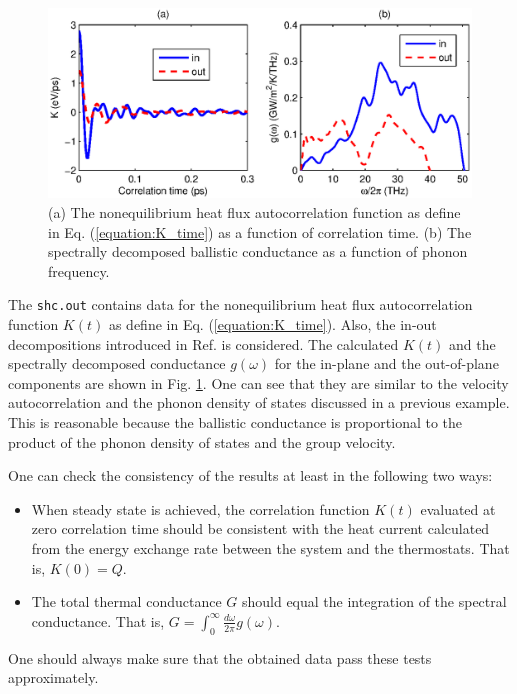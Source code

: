 \documentclass[12pt,a4paper]{report}
\begin{document}
\begin{figure}[h]
\begin{center}
\includegraphics[width=\columnwidth]{ex4b.eps}
\caption{(a) The nonequilibrium heat flux autocorrelation function as define in Eq. (\ref{equation:K_time}) as a function of correlation time. (b) The spectrally decomposed ballistic conductance as a function of phonon frequency. }
\label{figure:ex4b}
\end{center}
\end{figure}


The \verb"shc.out" contains data for the nonequilibrium heat flux autocorrelation function $K(t)$ as define in Eq. (\ref{equation:K_time}). Also, the in-out decompositions introduced in Ref. \cite{fan2017prb} is considered. The calculated $K(t)$ and the spectrally decomposed conductance $g(\omega)$ for the in-plane and the out-of-plane components are shown in Fig. \ref{figure:ex4b}. One can see that they are similar to the velocity autocorrelation and the phonon density of states discussed in a previous example. This is reasonable because the ballistic conductance is proportional to the product of the phonon density of states and the group velocity.

One can check the consistency of the results at least in the following two ways:
\begin{itemize}
\item When steady state is achieved, the correlation function $K(t)$ evaluated at zero correlation time should be consistent with the heat current calculated from the energy exchange rate between the system and the thermostats. That is, $K(0)=Q$.
\item The total thermal conductance $G$ should equal the integration of the spectral conductance. That is, $G = \int_0^{\infty} \frac{d\omega}{2\pi} g(\omega)$.
\end{itemize}
One should always make sure that the obtained data pass these tests approximately.



\end{document}
